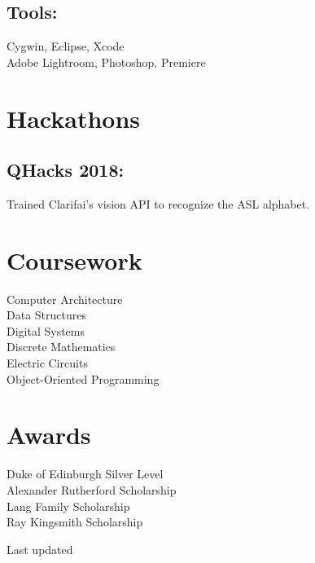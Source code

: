 \documentclass[]{hieudo-build}
\begin{document}
\begin{minipage}[t]{0.34\textwidth}
\subsection{Tools:}
Cygwin, Eclipse, Xcode\\
Adobe Lightroom, Photoshop, Premiere \\ 

\sectionsep

\section{Hackathons}
\subsection{QHacks 2018:}
Trained Clarifai's vision API to recognize the ASL alphabet.
\sectionsep


\section{Coursework}
Computer Architecture \\
Data Structures \\
Digital Systems \\
Discrete Mathematics \\
Electric Circuits \\
Object-Oriented Programming\\
\sectionsep

\section{Awards}
Duke of Edinburgh Silver Level\\
Alexander Rutherford Scholarship \\
Lang Family Scholarship \\
Ray Kingsmith Scholarship \\
\sectionsep

\sectionsep
{}
Last updated 

%
%
\end{minipage} 
\end{document}
